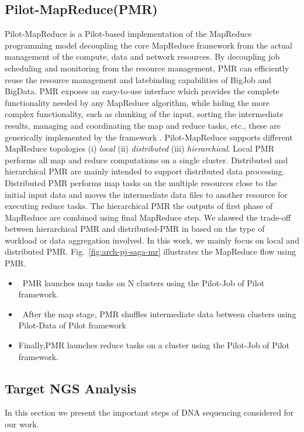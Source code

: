 \documentclass{acm_proc_article-sp}
\begin{document}
\subsection{Pilot-MapReduce(PMR)}
Pilot-MapReduce is a Pilot-based implementation of the MapReduce programming model decoupling the core MapReduce framework from the actual management of the compute, data and network resources. By decoupling job scheduling and monitoring from the resource management, PMR can efficiently reuse the resource management and latebinding capabilities of BigJob and BigData. PMR exposes an easy-to-use interface which provides the complete functionality needed by any MapReduce algorithm, while hiding the more complex functionality, such as chunking of the input, sorting the intermediate results, managing and coordinating the map and reduce tasks, etc., these are generically implemented by the framework \cite{pmr2012}.
Pilot-MapReduce supports different MapReduce topologies (i) \emph{local} (ii) \emph{distributed} (iii) \emph{hierarchical}. Local PMR performs all map and reduce computations on a single cluster.  Distributed and hierarchical PMR are mainly intended to support distributed data processing. Distributed PMR performs map tasks on the multiple resources close to the initial input data and moves the intermediate data files to another resource for executing reduce tasks. The hierarchical PMR the outputs of first phase of MapReduce are combined using final MapReduce step. We showed the trade-off between hierarchical PMR and distributed-PMR in \cite{pmr2012} based on the type of workload or data aggregation involved. In this work, we mainly focus on local and distributed PMR. Fig.~\ref{fig:arch-pj-saga-mr} illustrates the MapReduce flow using PMR.\begin{itemize}
\item{~PMR launches map tasks on N clusters using the Pilot-Job of Pilot framework.}
\item{~After the map stage, PMR shuffles intermediate data between clusters using Pilot-Data of Pilot framework} 
\item{Finally,PMR launches reduce tasks on a cluster using the Pilot-Job of Pilot framework.}
\end{itemize}

\subsection{Target NGS Analysis}
In this section we present the important steps of DNA sequencing considered for our work. 
\end{document}
